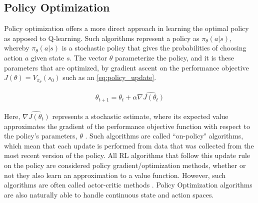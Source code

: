 \subsection{Policy Optimization}
Policy optimization offers a more direct approach in learning the optimal policy as apposed to Q-learning. Such algorithms represent a policy as $\pi_{\theta}(a|s)$, whereby $\pi_{\theta}(a|s)$ is a stochastic policy that gives the probabilities of choosing action $a$ given state $s$. The vector $\theta$ parameterize the policy, and it is these parameters that are optimized, by gradient ascent on the performance objective $J(\theta) = V_{\pi_{\theta}}(s_0)$ such as an \autoref{eq:policy_update}.


\begin{equation}
	\begin{aligned}
		\theta_{t+1} = \theta_{t} + \alpha \hat{\nabla J(\theta_t)}
	\end{aligned}
	\label{eq:policy_update}
\end{equation}

Here, $\hat{\nabla J(\theta_t)}$ represents a stochastic estimate, where its expected value approximates the gradient of the performance objective function with respect to the policy's parameters, $\theta$ \cite{suttonReinforcementLearningIntroduction2014}. Such algorithms are called ``on-policy" algorithms, which mean that each update is performed from data that was collected from the most recent version of the policy.
All RL algorithms that follow this update rule on the policy are considered policy gradient/optimization methods, whether or not they also learn an approximation to a value function. However, such algorithms are often called actor-critic methods \cite{suttonReinforcementLearningIntroduction2014}.  Policy Optimization algorithms are also naturally able to handle continuous state and action spaces.


